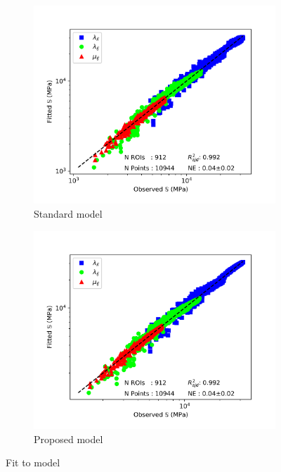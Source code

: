 \documentclass[a4paper,fleqn]{DC_ArtStyle}
\begin{document}
	\begin{figure}
		\centering
		\begin{subfigure}[b]{0.45\linewidth}
			\includegraphics[width=\linewidth]{../_Results/FullKModel}
			\caption{Standard model}
		\end{subfigure}
		\begin{subfigure}[b]{0.45\linewidth}
			\includegraphics[width=\linewidth]{../_Results/FullKModel_AverageFabric}
			\caption{Proposed model}
		\end{subfigure}
		\caption{Fit to model}
	\end{figure}
\end{document}
